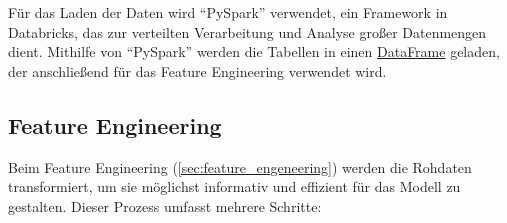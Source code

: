 Für das Laden der Daten wird \enquote{PySpark} verwendet, ein Framework in Databricks, das zur verteilten Verarbeitung und Analyse großer Datenmengen dient. Mithilfe von \enquote{PySpark} werden die Tabellen in einen \href{https://spark.apache.org/docs/latest/api/python/reference/pyspark.sql/api/pyspark.sql.DataFrame.html}{DataFrame} geladen, der anschließend für das Feature Engineering verwendet wird.


\subsection{Feature Engineering}
\label{sec:feature_engeneering_impl}


Beim Feature Engineering (\cref{sec:feature_engeneering}) werden die Rohdaten transformiert, um sie möglichst informativ und effizient für das Modell zu gestalten. Dieser Prozess umfasst mehrere Schritte:


